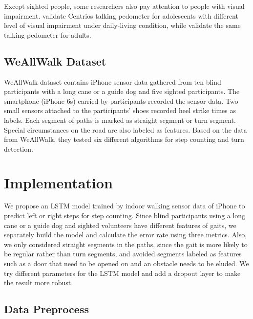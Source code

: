 \documentclass[11pt]{article}
\begin{document}
{Except sighted people, some researchers also pay attention to people with visual impairment. \cite{haegele2015validation} validate Centrios talking pedometer for adolescents with different level of visual impairment under daily-living condition, while  \cite{holbrook2011validation} validate the same talking pedometer for adults.



\subsection{WeAllWalk Dataset}

WeAllWalk dataset \cite{flores2016weallwalk} contains iPhone sensor data gathered from ten blind participants with a long cane or a guide dog and five sighted participants. The smartphone (iPhone 6s) carried by participants recorded the sensor data. Two small sensors attached to the participants’ shoes recorded heel strike times as labels. Each segment of paths is marked as straight segment or turn segment. Special circumstances on the road are also labeled as features. Based on the data from WeAllWalk, they tested six different algorithms for step counting and turn detection. 


\section{Implementation}
We propose an LSTM model trained by indoor walking sensor data of iPhone to predict left or right steps for step counting. Since blind participants using a long cane or a guide dog and sighted volunteers have different features of gaits, we separately build the model and calculate the error rate using three metrics. Also, we only considered straight segments in the paths, since the gait is more likely to be regular rather than turn segments, and avoided segments labeled as features such as a door that need to be opened on and an obstacle needs to be eluded. We try different parameters for the LSTM model and add a dropout layer to make the result more robust.

\subsection{Data Preprocess}

}
\end{document}
